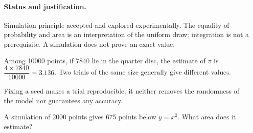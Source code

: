 \paragraph{Status and justification.} Simulation principle accepted and explored experimentally. The equality of probability and area is an interpretation of the uniform draw; integration is not a prerequisite. A simulation does not prove an exact value.
\begin{example}Among 10000 points, if 7840 lie in the quarter disc, the estimate of $\pi$ is $\dfrac{4\times 7840}{10000}=3.136$. Two trials of the same size generally give different values.\end{example}\label{C05-EX5}
\begin{pitfall}Fixing a seed makes a trial reproducible; it neither removes the randomness of the model nor guarantees any accuracy.\end{pitfall}
\begin{application}A simulation of 2000 points gives 675 points below $y=x^2$. What area does it estimate?\end{application}\label{C05-AP5}
